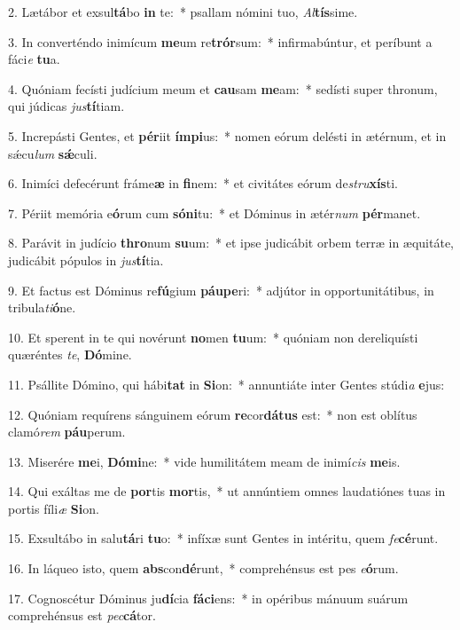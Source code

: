 2. Lætábor et exsul\textbf{tá}bo \textbf{in} te:~*  psallam nómini tuo, \textit{Al}\textbf{tís}sime.\

3. In converténdo inimícum \textbf{me}um re\textbf{trór}sum:~*  infirmabúntur, et períbunt a fáci\textit{e} \textbf{tu}a.\

4. Quóniam fecísti judícium meum et \textbf{cau}sam \textbf{me}am:~*  sedísti super thronum, qui júdicas \textit{jus}\textbf{tí}tiam.\

5. Increpásti Gentes, et \textbf{pér}iit \textbf{ím}\textbf{pi}us:~*  nomen eórum delésti in ætérnum, et in sǽcu\textit{lum} \textbf{sǽ}culi.\

6. Inimíci defecérunt fráme\textbf{æ} in \textbf{fi}nem:~*  et civitátes eórum de\textit{stru}\textbf{xís}ti.\

7. Périit memória e\textbf{ó}rum cum \textbf{só}\textbf{ni}tu:~*  et Dóminus in ætér\textit{num} \textbf{pér}manet.\

8. Parávit in judício \textbf{thro}num \textbf{su}um:~*  et ipse judicábit orbem terræ in æquitáte, judicábit pópulos in \textit{jus}\textbf{tí}tia.\

9. Et factus est Dóminus re\textbf{fú}gium \textbf{páu}\textbf{pe}ri:~*  adjútor in opportunitátibus, in tribula\textit{ti}\textbf{ó}ne.\

10. Et sperent in te qui novérunt \textbf{no}men \textbf{tu}um:~*  quóniam non dereliquísti quæréntes \textit{te}, \textbf{Dó}mine.\

11. Psállite Dómino, qui hábi\textbf{tat} in \textbf{Si}on:~*  annuntiáte inter Gentes stúdi\textit{a} \textbf{e}jus:\

12. Quóniam requírens sánguinem eórum \textbf{re}cor\textbf{dá}\textbf{tus} est:~*  non est oblítus clamó\textit{rem} \textbf{páu}perum.\

13. Miserére \textbf{me}i, \textbf{Dó}\textbf{mi}ne:~*  vide humilitátem meam de inimí\textit{cis} \textbf{me}is.\

14. Qui exáltas me de \textbf{por}tis \textbf{mor}tis,~*  ut annúntiem omnes laudatiónes tuas in portis fíli\textit{æ} \textbf{Si}on.\

15. Exsultábo in salu\textbf{tá}ri \textbf{tu}o:~*  infíxæ sunt Gentes in intéritu, quem \textit{fe}\textbf{cé}runt.\

16. In láqueo isto, quem \textbf{abs}con\textbf{dé}runt,~*  comprehénsus est pes \textit{e}\textbf{ó}rum.\

17. Cognoscétur Dóminus ju\textbf{dí}cia \textbf{fá}\textbf{ci}ens:~*  in opéribus mánuum suárum comprehénsus est \textit{pec}\textbf{cá}tor.\

